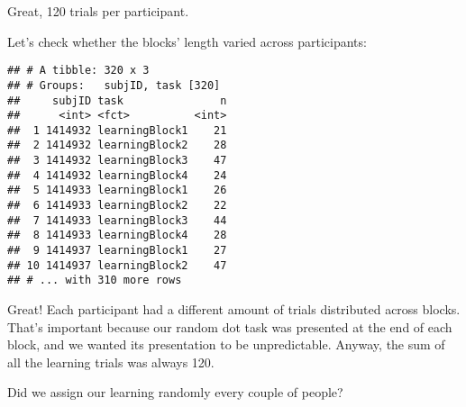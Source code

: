\documentclass[
]{article}
\newenvironment{Shaded}{\begin{snugshade}}{\end{snugshade}}
\newcommand{\KeywordTok}[1]{\textcolor[rgb]{0.13,0.29,0.53}{\textbf{#1}}}
\newcommand{\NormalTok}[1]{#1}
\newcommand{\OperatorTok}[1]{\textcolor[rgb]{0.81,0.36,0.00}{\textbf{#1}}}
\newcommand{\StringTok}[1]{\textcolor[rgb]{0.31,0.60,0.02}{#1}}
\begin{document}
Great, 120 trials per participant.

Let's check whether the blocks' length varied across participants:

\begin{Shaded}
\end{Shaded}

\begin{verbatim}
## # A tibble: 320 x 3
## # Groups:   subjID, task [320]
##     subjID task               n
##      <int> <fct>          <int>
##  1 1414932 learningBlock1    21
##  2 1414932 learningBlock2    28
##  3 1414932 learningBlock3    47
##  4 1414932 learningBlock4    24
##  5 1414933 learningBlock1    26
##  6 1414933 learningBlock2    22
##  7 1414933 learningBlock3    44
##  8 1414933 learningBlock4    28
##  9 1414937 learningBlock1    27
## 10 1414937 learningBlock2    47
## # ... with 310 more rows
\end{verbatim}

Great! Each participant had a different amount of trials distributed
across blocks. That's important because our random dot task was
presented at the end of each block, and we wanted its presentation to be
unpredictable. Anyway, the sum of all the learning trials was always
120.

Did we assign our learning randomly every couple of people?

\begin{Shaded}
\end{Shaded}
\end{document}
